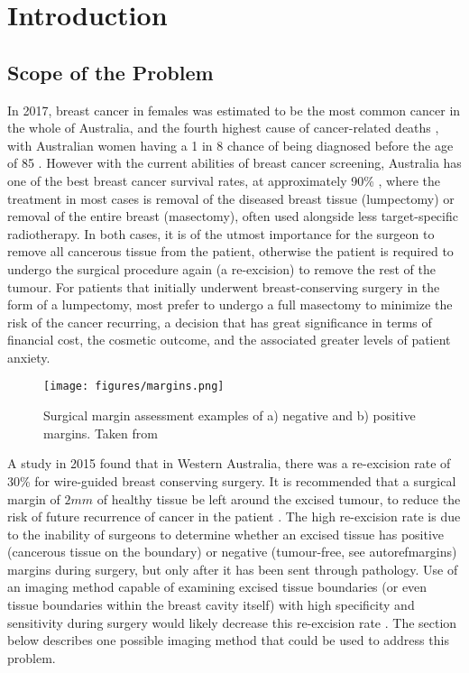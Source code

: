  \chapter{Introduction}

\section{Scope of the Problem}\label{problem}
In 2017, breast cancer in females was estimated to be the most common cancer in the whole of Australia, and the fourth highest cause of cancer-related deaths \cite{australian_institute_of_health_and_welfare_cancer_2017}, with Australian women having a 1 in 8 chance of being diagnosed before the age of 85 \cite{australian_institute_of_health_and_welfare_breast_2012}. However with the current abilities of breast cancer screening, Australia has one of the best breast cancer survival rates, at approximately 90\% \cite{australian_institute_of_health_and_welfare_breast_2012}, where the treatment in most cases is removal of the diseased breast tissue (lumpectomy) or removal of the entire breast (masectomy), often used alongside less target-specific radiotherapy. In both cases, it is of the utmost importance for the surgeon to remove all cancerous tissue from the patient, otherwise the patient is required to undergo the surgical procedure again (a re-excision) to remove the rest of the tumour. For patients that initially underwent breast-conserving surgery in the form of a lumpectomy, most prefer to undergo a full masectomy to minimize the risk of the cancer recurring, a decision that has great significance in terms of financial cost, the cosmetic outcome, and the associated greater levels of patient anxiety. 

\begin{figure}
	\centering
    \texttt{[image: figures/margins.png]}
    \caption{Surgical margin assessment examples of a) negative and b) positive margins. Taken from \cite{breastcancer.org_surgical_2017}}
	    \label{margins}
\end{figure}

A study in 2015 \cite{ballal_predictors_2015} found that in Western Australia, there was a re-excision rate of 30\% for wire-guided breast conserving surgery. It is recommended that a surgical margin of $2mm$ of healthy tissue be left around the excised tumour, to reduce the risk of future recurrence of cancer in the patient \cite{behm_surgical_2013}. The high re-excision rate is due to the inability of surgeons to determine whether an excised tissue has positive (cancerous tissue on the boundary) or negative (tumour-free, see autoref{margins}) margins during surgery, but only after it has been sent through pathology. Use of an imaging method capable of examining excised tissue boundaries (or even tissue boundaries within the breast cavity itself) with high specificity and sensitivity during surgery would likely decrease this re-excision rate \cite{ballal_predictors_2015}. The section below describes one possible imaging method that could be used to address this problem. 

